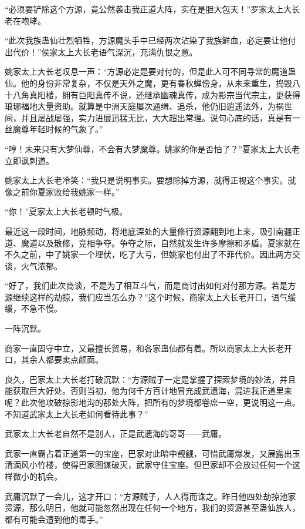 
\begin{this_body}

“必须要铲除这个方源，竟公然袭击我正道大阵，实在是胆大包天！”罗家太上大长老在咆哮。

“此次我族蛊仙壮烈牺牲，方源魔头手中已经两次沾染了我族鲜血，必定要让他付出代价！”侯家太上大长老语气深沉，充满仇恨之意。

姚家太上大长老叹息一声：“方源必定是要对付的，但是此人可不同寻常的魔道蛊仙。他的身份非常复杂，不仅是天外之魔，更有春秋蝉傍身，从未来重生，捣毁八十八角真阳楼，拥有巨阳真传不说，还继承幽魂真传，成为影宗当代宗主，更获得琅琊福地大量资助。就算是中洲天庭屡次通缉、追杀，他仍旧逍遥法外，为祸世间，并且屡战屡强，实力进展迅猛无比，大大超出常理。说句心底的话，真是有一丝魔尊年轻时候的气象了。”

“哼！未来只有大梦仙尊，不会有大梦魔尊。姚家的你是否怕了？”夏家太上大长老立即讽刺道。

姚家太上大长老冷笑：“我只是说明事实。要想除掉方源，就得正视这个事实。就像之前你夏家败给我姚家一样。”

“你！”夏家太上大长老顿时气极。

最近这一段时间，地脉频动，将地底深处的大量修行资源翻到地上来，吸引南疆正道、魔道以及散修，竞相争夺。争夺之际，自然就发生许多摩擦和矛盾。夏家就在不久之前，中了姚家一个埋伏，吃了大亏，但姚家也付出了不菲代价。因此两方交谈，火气浓郁。

“好了，我们此次商谈，不是为了相互斗气，而是商讨出如何对付那方源。若是方源继续这样的劫掠，我们应当怎么办？”这个时候，商家太上大长老开口，语气缓缓，不急不慢。

一阵沉默。

商家一直固守中立，又最擅长贸易，和各家蛊仙都有着。所以商家太上大长老开口，其余人都要卖点颜面。

良久，巴家太上大长老打破沉默：“方源贼子一定是掌握了探索梦境的妙法，并且能获取巨大好处。否则当初，他为何千方百计地冒充成武遗海，混进我正道里来呢？此次他攻破掠影地沟的那处大阵，把所有的梦境都卷席一空，更说明这一点。不知道武家太上大长老如何看待此事？”

武家太上大长老自然不是别人，正是武遗海的哥哥——武庸。

武家一直霸占着正道第一的宝座，巴家对此暗中觊觎，可惜武庸爆发，又展露出玉清滴风小竹楼，使得巴家图谋破灭，武家守住宝座。但巴家却不会放过任何一个这样微小的机会。

武庸沉默了一会儿，这才开口：“方源贼子，人人得而诛之。昨日他四处劫掠池家资源，那么明日，他就可能忽然出现在任何一个地方，我们的资源甚至蛊仙族人，都有可能会遭到他的毒手。”


\end{this_body}
